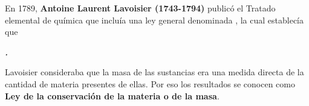 \begin{warncard}[adjusted title={Ley de la conservación de la materia}]
    En 1789, \textbf{Antoine Laurent Lavoisier (1743-1794)} publicó el Tratado elemental
    de química que incluía una ley general denominada , la cual establecía que
    \begin{center}\centering\bfseries\sffamily\color{colorrds}
        \emph{.}
    \end{center}
    Lavoisier consideraba que la masa de las sustancias era una medida
    directa de la cantidad de materia presentes de ellas. Por eso los resultados se
    conocen como \textbf{Ley de la conservación de la materia o de la masa}.
\end{warncard}